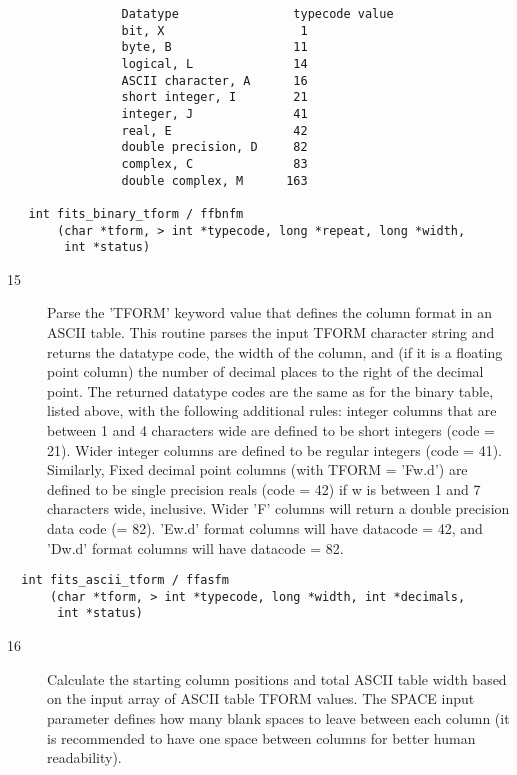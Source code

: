 \begin{verbatim}
                Datatype                typecode value
                bit, X                   1
                byte, B                 11
                logical, L              14
                ASCII character, A      16
                short integer, I        21
                integer, J              41
                real, E                 42
                double precision, D     82
                complex, C              83
                double complex, M      163

   int fits_binary_tform / ffbnfm
       (char *tform, > int *typecode, long *repeat, long *width,
        int *status)
\end{verbatim}

\begin{description}
\item[15] Parse the 'TFORM' keyword value that defines the column format in
    an ASCII table.  This routine parses the input TFORM character
    string and returns the datatype code, the width of the column,
    and (if it is a floating point column) the number of decimal places
    to the right of the decimal point.  The returned datatype codes are
    the same as for the binary table, listed above, with the following
    additional rules:  integer columns that are between 1 and 4 characters
    wide are defined to be short integers (code = 21).  Wider integer
    columns are defined to be regular integers (code = 41).  Similarly,
    Fixed decimal point columns (with TFORM = 'Fw.d') are defined to
    be single precision reals (code = 42) if w is between 1 and 7 characters
    wide, inclusive.  Wider 'F' columns will return a double precision
    data code (= 82).  'Ew.d' format columns will have datacode = 42,
   and 'Dw.d' format columns will have datacode = 82.
\end{description}

\begin{verbatim}
  int fits_ascii_tform / ffasfm
      (char *tform, > int *typecode, long *width, int *decimals,
       int *status)
\end{verbatim}

\begin{description}
\item[16] Calculate the starting column positions and total ASCII table width
    based on the input array of ASCII table TFORM values.  The SPACE input
    parameter defines how many blank spaces to leave between each column
    (it is recommended to have one space between columns for better human
   readability).
\end{description}

